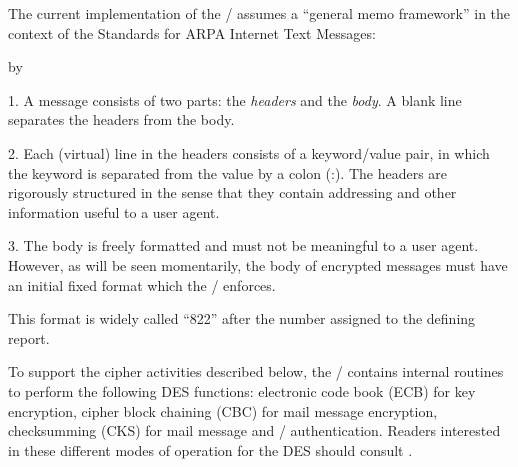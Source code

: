 The current implementation of the \TMA/ assumes a ``general memo framework''
in the context of the Standards for ARPA Internet Text Messages\cite{DCroc82}:
\smallskip
{\advance\leftskip by\parindent
\item{1.} A message consists of two parts:
the {\it headers} and the {\it body}.
A blank line separates the headers from the body.

\item{2.} Each (virtual) line in the headers consists of a keyword/value
pair, in which the keyword is separated from the value by a colon (:).
The headers are rigorously structured in the sense that they contain
addressing and other information useful to a user agent.

\item{3.} The body is freely formatted and must not be meaningful to a
user agent.
However, as will be seen momentarily,
the body of encrypted messages must have an initial fixed format which the
\TMA/ enforces.
\smallskip}
\noindent
This format is widely called ``822'' after the number assigned to the
defining report\cite{DCroc82}.%

To support the cipher activities described below,
the \TMA/ contains internal routines to perform the following DES functions:
electronic code book (ECB) for key encryption,
cipher block chaining (CBC) for mail message encryption,
checksumming (CKS) for mail message and \CSM/ authentication.
Readers interested in these different modes of operation for the DES should
consult \cite{FIPS81}.

